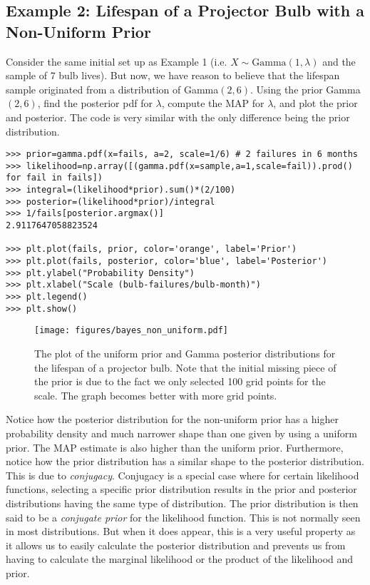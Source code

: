 \subsection*{Example 2: Lifespan of a Projector Bulb with a Non-Uniform Prior}
Consider the same initial set up as Example 1 (i.e. $X\sim\text{Gamma}(1,\lambda)$ and the sample of 7 bulb lives).
But now, we have reason to believe that the lifespan sample originated from a distribution of Gamma$(2,6)$.
Using the prior Gamma$(2,6)$, find the posterior pdf for $\lambda$, compute the MAP for $\lambda$, and plot the prior and posterior.
The code is very similar with the only difference being the prior distribution.

\begin{lstlisting}
>>> prior=gamma.pdf(x=fails, a=2, scale=1/6) # 2 failures in 6 months
>>> likelihood=np.array([(gamma.pdf(x=sample,a=1,scale=fail)).prod() for fail in fails])
>>> integral=(likelihood*prior).sum()*(2/100)
>>> posterior=(likelihood*prior)/integral
>>> 1/fails[posterior.argmax()]
2.9117647058823524

>>> plt.plot(fails, prior, color='orange', label='Prior')
>>> plt.plot(fails, posterior, color='blue', label='Posterior')
>>> plt.ylabel("Probability Density")
>>> plt.xlabel("Scale (bulb-failures/bulb-month)")
>>> plt.legend()
>>> plt.show()
\end{lstlisting}

\begin{figure}[H]
    \centering
    \texttt{[image: figures/bayes\_non\_uniform.pdf]}
    \caption{The plot of the uniform prior and Gamma posterior distributions for the lifespan of a projector bulb. Note that the initial missing piece of the prior is due to the fact we
    only selected 100 grid points for the scale. The graph becomes better with more grid points.}
\end{figure}

Notice how the posterior distribution for the non-uniform prior has a higher probability density and much narrower shape than one given by using a uniform prior.
The MAP estimate is also higher than the uniform prior.
Furthermore, notice how the prior distribution has a similar shape to the posterior distribution.
This is due to \emph{conjugacy}. Conjugacy is a special case where for certain likelihood functions, selecting a specific prior distribution results in the prior and posterior distributions having the same type of distribution.
The prior distribution is then said to be a \emph{conjugate prior} for the likelihood function.
This is not normally seen in most distributions.
But when it does appear, this is a very useful property as it allows us to easily calculate the posterior distribution and prevents us from having to calculate the marginal likelihood or the product of the likelihood and prior.

